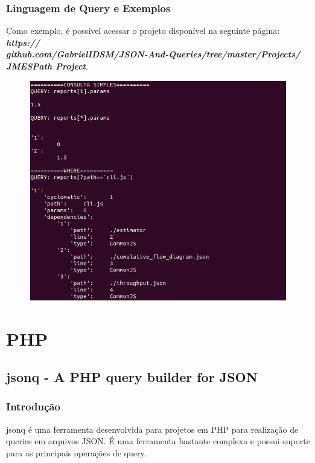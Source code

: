\documentclass[a4paper, 12pt] {article}
\begin{document}
			\subsubsection{Linguagem de Query e Exemplos}
				Como exemplo, é possível acessar o projeto disponível na seguinte página: \textbf{\textit{https://\\github.com/GabrielIDSM/JSON-And-Queries/tree/master/Projects/\\JMESPath Project}}.
			\begin{figure}[H]
				\centering
				\includegraphics[width=16cm]{jmespath-lua.png}
				\label{figure:Image}
			\end{figure}
	\newpage \section{PHP}
		\subsection{jsonq - A PHP query builder for JSON}
			\subsubsection{Introdução}
				jsonq é uma ferramenta desenvolvida para projetos em PHP para realização de queries em arquivos JSON. É uma ferramenta bastante complexa e possui suporte para as principais operações de query.
\end{document}
